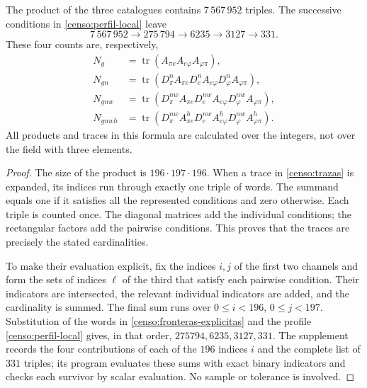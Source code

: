 \begin{theorem}
\label{censo:teorema-conteo}
The product of the three catalogues contains \(7\,567\,952\) triples.
The successive conditions in \eqref{censo:perfil-local} leave
\begin{equation}
 7\,567\,952\longrightarrow275\,794\longrightarrow6235
 \longrightarrow3127\longrightarrow331.
 \label{censo:cadena-local}
\end{equation}
These four counts are, respectively,
\begin{align}
 N_g&=\operatorname{tr}(A_{\pi e}A_{e\varphi}A_{\varphi\pi}),
 \nonumber\\
 N_{gn}&=\operatorname{tr}(D_\pi^n A_{\pi e}
             D_e^n A_{e\varphi}D_\varphi^n A_{\varphi\pi}),
 \nonumber\\
 N_{gnw}&=\operatorname{tr}(D_\pi^{nw} A_{\pi e}
             D_e^{nw} A_{e\varphi}D_\varphi^{nw} A_{\varphi\pi}),
 \nonumber\\
 N_{gnwh}&=\operatorname{tr}(D_\pi^{nw} A^h_{\pi e}
             D_e^{nw} A^h_{e\varphi}D_\varphi^{nw} A^h_{\varphi\pi}).
 \label{censo:trazas}
\end{align}
All products and traces in this formula are calculated over the integers,
not over the field with three elements.
\end{theorem}
\begin{proof}
The size of the product is \(196\cdot197\cdot196\). When a trace in
\eqref{censo:trazas} is expanded, its indices run through exactly one
triple of words. The summand equals one if it satisfies all the represented
conditions and zero otherwise. Each triple is counted once.
The diagonal matrices add the individual conditions; the rectangular
factors add the pairwise conditions. This proves that the
traces are precisely the stated cardinalities.

To make their evaluation explicit, fix the indices \(i,j\) of the first
two channels and form the sets of indices \(\ell\) of the third
that satisfy each pairwise condition. Their indicators are intersected,
the relevant individual indicators are added, and the cardinality is summed.
The final sum runs over \(0\leq i<196\), \(0\leq j<197\).
Substitution of the words in \eqref{censo:fronteras-explicitas} and
the profile \eqref{censo:perfil-local} gives, in that order,
\(275794,6235,3127,331\). The supplement records the four contributions
of each of the \(196\) indices \(i\) and the complete list of \(331\) triples;
its program evaluates these sums with exact binary indicators and checks
each survivor by scalar evaluation. No sample or tolerance is involved.
\end{proof}

